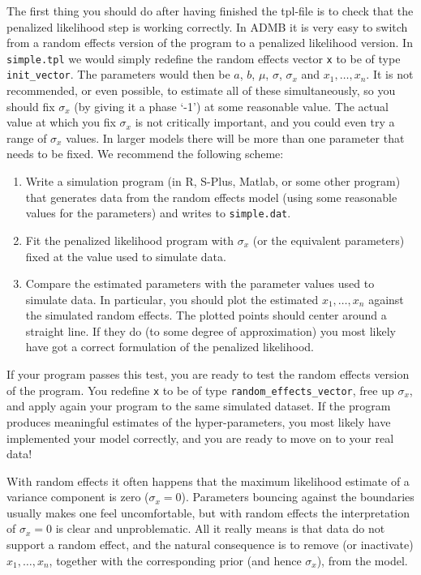 \documentclass[12pt,letter,reqno]{book}
\begin{document}
The first thing you should do after having finished the tpl-file is to check that
the penalized likelihood step is working correctly. In ADMB it is very easy to switch from a random effects
version of the program to a penalized likelihood version. In \texttt{simple.tpl} we would simply redefine the
random effects vector \texttt{x} to be of type \texttt{init\_vector}. The parameters would then be $a$, $b$,
$\mu $, $\sigma $, $\sigma_{x}$ and $x_{1},\ldots ,x_{n}$. It is not recommended, or even possible, to estimate
all of these simultaneously, so you should fix $\sigma_{x}$ (by giving it a phase `-1') at some reasonable
value. The actual value at which you fix $\sigma_{x}$ is not critically important, and you could even try a
range of $\sigma_{x}$ values. In larger models there will be more than one parameter that needs to be fixed.
We recommend the following scheme:
\begin{enumerate}
\item Write a simulation program (in R, S-Plus, Matlab, or some other
program) that generates data from the random effects model (using some
reasonable values for the parameters) and writes to \texttt{simple.dat}.

\item Fit the penalized likelihood program with $\sigma_{x}$ (or the
equivalent parameters) fixed at the value used to simulate data.

\item Compare the estimated parameters with the parameter values used to
simulate data. In particular, you should plot the estimated $x_{1},\ldots,x_{n}$
against the simulated random effects. The plotted points should center
around a straight line. If they do (to some degree of approximation) you
most likely have got a correct formulation of the penalized likelihood.
\end{enumerate}
If your program passes this test, you are ready to test the random effects version of the program. You redefine
\texttt{x} to be of type \texttt{random\_effects\_vector}, free up $\sigma_{x}$, and apply again your program to
the same simulated dataset. If the program produces meaningful estimates of the hyper-parameters, you most
likely have implemented your model correctly, and you are ready to move on to your real data!

With random effects it often happens that the maximum likelihood estimate of
a variance component is zero ($\sigma_{x}=0$). Parameters bouncing
against the boundaries usually makes one feel uncomfortable, but with random
effects the interpretation of $\sigma_{x}=0$ is clear and unproblematic. All
it really means is that data do not support a random effect, and the natural
consequence is to remove (or inactivate) $x_{1},\ldots ,x_{n}$, together
with the corresponding prior (and hence $\sigma_{x}$), from the model.
\end{document}
